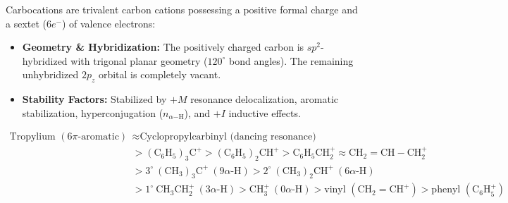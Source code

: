 \documentclass[10pt,a4paper]{article}
\begin{document}
\begin{conceptbox}
Carbocations are trivalent carbon cations possessing a positive formal charge and a sextet ($6e^-$) of valence electrons:
\begin{itemize}
  \item \textbf{Geometry \& Hybridization:} The positively charged carbon is $sp^2$-hybridized with trigonal planar geometry ($120^\circ$ bond angles). The remaining unhybridized $2p_z$ orbital is completely vacant.
  \item \textbf{Stability Factors:} Stabilized by $+M$ resonance delocalization, aromatic stabilization, hyperconjugation ($n_{\alpha\mathrm{-H}}$), and $+I$ inductive effects.
\end{itemize}
\begin{equation}
  \begin{aligned}
    \text{Tropylium } (6\pi\text{-aromatic}) &\approx \text{Cyclopropylcarbinyl (dancing resonance)} \\
    &> \mathrm{(C_6H_5)_3C^+} > \mathrm{(C_6H_5)_2CH^+} > \mathrm{C_6H_5CH_2^+} \approx \mathrm{CH_2=CH-CH_2^+} \\
    &> 3^\circ \ \mathrm{(CH_3)_3C^+} \ (9\alpha\text{-H}) > 2^\circ \ \mathrm{(CH_3)_2CH^+} \ (6\alpha\text{-H}) \\
    &> 1^\circ \ \mathrm{CH_3CH_2^+} \ (3\alpha\text{-H}) > \mathrm{CH_3^+} \ (0\alpha\text{-H}) > \text{vinyl } (\mathrm{CH_2=CH^+}) > \text{phenyl } (\mathrm{C_6H_5^+})
  \end{aligned}
\end{equation}
\end{conceptbox}
\end{document}
